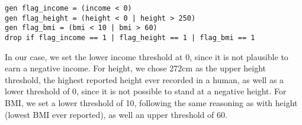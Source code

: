 \begin{verbatim}
gen flag_income = (income < 0)
gen flag_height = (height < 0 | height > 250)
gen flag_bmi = (bmi < 10 | bmi > 60)
drop if flag_income == 1 | flag_height == 1 | flag_bmi == 1
\end{verbatim}

\newpage

In our case, we set the lower income threshold at 0, since it is not plausible to earn a negative income. For height, we chose 272cm as the upper height threshold, the highest reported height ever recorded in a human, as well as a lower threshold of 0, since it is not possible to stand at a negative height. For BMI, we set a lower threshold of 10, following the same reasoning as with height (lowest BMI ever reported), as well an upper threshold of 60.